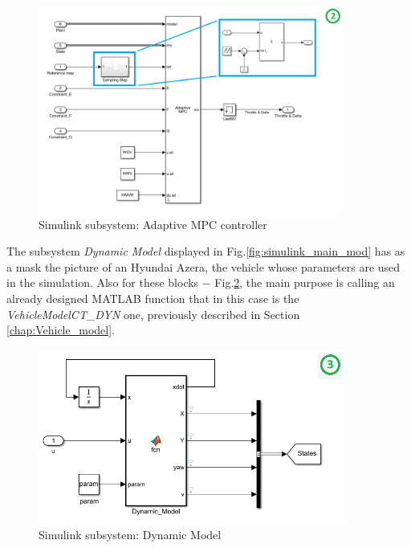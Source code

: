 \begin{figure}[H]
    \centering
    \includegraphics[width=0.9\textwidth]{Figures/simulink_mpc_mod.png}
    \caption{Simulink subsystem: Adaptive MPC controller}
    \label{fig:simulink_mpc_mod}
\end{figure}
The subsystem \textit{Dynamic Model} displayed in Fig.\ref{fig:simulink_main_mod} has as a mask the picture of an Hyundai Azera, the vehicle whose parameters are used in the simulation. Also for these blocks $-$ Fig.\ref{fig:simulink_dyn_mod_mod}, the main purpose is calling an already designed MATLAB function that in this case is the \textit{VehicleModelCT\_DYN} one, previously described in Section \ref{chap:Vehicle_model}.
\begin{figure}[H]
    \centering
    \includegraphics[width=0.9\textwidth]{Figures/simulink_dyn_mod_mod.png}
    \caption{Simulink subsystem: Dynamic Model}
    \label{fig:simulink_dyn_mod_mod}
\end{figure} 





